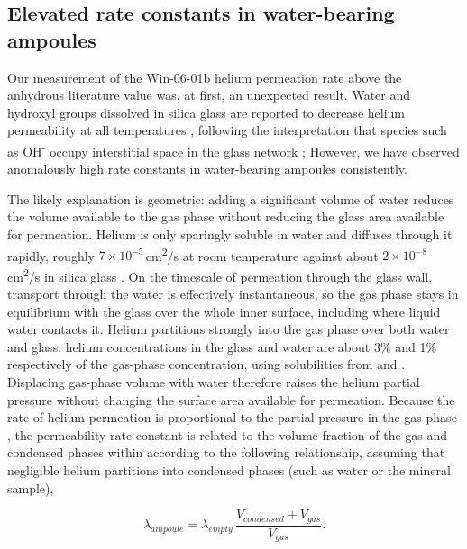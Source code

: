 \subsection{Elevated rate constants in water-bearing ampoules}\label{sec:discussion-rate-constant}

Our measurement of the Win-06-01b helium permeation rate above the anhydrous literature value was, at first, an unexpected result. Water and hydroxyl groups dissolved in silica glass are reported to decrease helium permeability at all temperatures \citep{tsuru2011,shelby1972,masaryk1968}, following the interpretation that species such as OH\textsuperscript{-} occupy interstitial space in the glass network \citep{norton1953,shackelford1999}; However, we have observed anomalously high rate constants in water-bearing ampoules consistently.

The likely explanation is geometric: adding a significant volume of water reduces the volume available to the gas phase without reducing the glass area available for permeation. Helium is only sparingly soluble in water and diffuses through it rapidly, roughly $7 \times 10^{-5}$\,cm\textsuperscript{2}/s at room temperature \citep{verhallen1984} against about $2 \times 10^{-8}$\,cm\textsuperscript{2}/s in silica glass \citep{swets1961}. On the timescale of permeation through the glass wall, transport through the water is effectively instantaneous, so the gas phase stays in equilibrium with the glass over the whole inner surface, including where liquid water contacts it. Helium partitions strongly into the gas phase over both water and glass: helium concentrations in the glass and water are about 3\% and 1\% respectively of the gas-phase concentration, using solubilities from \citet{sander2015} and \citet{swets1961}. Displacing gas-phase volume with water therefore raises the helium partial pressure without changing the surface area available for permeation. Because the rate of helium permeation is proportional to the partial pressure in the gas phase \citep{norton1953,altemose1961,swets1961,masaryk1968}, the permeability rate constant is related to the volume fraction of the gas and condensed phases within according to the following relationship, assuming that negligible helium partitions into condensed phases (such as water or the mineral sample),

\begin{equation}
\label{eq:keff}
\lambda_{ampoule} = \lambda_{empty}\,\frac{V_{condensed} + V_{gas}}{V_{gas}} .
\end{equation}

